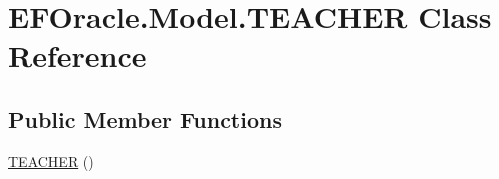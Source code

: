 \hypertarget{class_e_f_oracle_1_1_model_1_1_t_e_a_c_h_e_r}{}\section{E\+F\+Oracle.\+Model.\+T\+E\+A\+C\+H\+ER Class Reference}
\label{class_e_f_oracle_1_1_model_1_1_t_e_a_c_h_e_r}
\subsection*{Public Member Functions}
\begin{DoxyCompactItemize}
\item 
\hyperlink{class_e_f_oracle_1_1_model_1_1_t_e_a_c_h_e_r_af91d6d5df1d9ac2513842643bd3e43b2}{T\+E\+A\+C\+H\+ER} ()
\end{DoxyCompactItemize}
